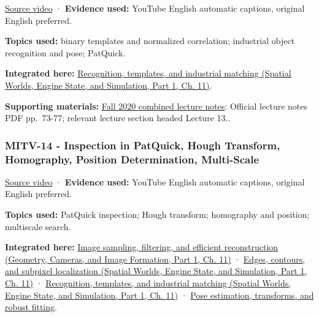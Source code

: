 \hypertarget{04-visual-computing-ii-ch036-mitv-13---object-detection-recognition-and-pose-determination-patquick-us-7016539}{}

\href{https://www.youtube.com/watch?v=lVfm6C51t_Y}{Source video} · \textbf{Evidence used:} YouTube English automatic captions, original English preferred.

\textbf{Topics used:} binary templates and normalized correlation; industrial object recognition and pose; PatQuick.

\textbf{Integrated here:} \href{../05-Spatial-Worlds-Engine-State-and-Simulation-P01/main.pdf\#04-visual-computing-ii-ch030-recognition-templates-and-industrial-matching}{Recognition, templates, and industrial matching (Spatial Worlds, Engine State, and Simulation, Part 1, Ch. 11)}.

\textbf{Supporting materials:} \href{https://ocw.mit.edu/courses/6-801-machine-vision-fall-2020/9ec44f69e72995c370b3797818ba01e6_MIT6_801F20_lectureNotes.pdf}{Fall 2020 combined lecture notes}: Official lecture notes PDF pp.~73-77; relevant lecture section headed Lecture 13..

\subsubsection{MITV-14 - Inspection in PatQuick, Hough Transform, Homography, Position Determination, Multi-Scale}\label{04-visual-computing-ii-ch036-mitv-14---inspection-in-patquick-hough-transform-homography-position-determination-multi-scale}

\hypertarget{04-visual-computing-ii-ch036-mitv-14---inspection-in-patquick-hough-transform-homography-position-determination-multi-scale}{}

\href{https://www.youtube.com/watch?v=6SvDRpQeZrA}{Source video} · \textbf{Evidence used:} YouTube English automatic captions, original English preferred.

\textbf{Topics used:} PatQuick inspection; Hough transform; homography and position; multiscale search.

\textbf{Integrated here:} \href{../03-Geometry-Cameras-and-Image-Formation-P01/main.pdf\#03-visual-computing-i-ch004-image-sampling-filtering-and-efficient-reconstruction}{Image sampling, filtering, and efficient reconstruction (Geometry, Cameras, and Image Formation, Part 1, Ch. 11)} · \href{../05-Spatial-Worlds-Engine-State-and-Simulation-P01/main.pdf\#04-visual-computing-ii-ch030-edges-contours-and-subpixel-localization}{Edges, contours, and subpixel localization (Spatial Worlds, Engine State, and Simulation, Part 1, Ch. 11)} · \href{../05-Spatial-Worlds-Engine-State-and-Simulation-P01/main.pdf\#04-visual-computing-ii-ch030-recognition-templates-and-industrial-matching}{Recognition, templates, and industrial matching (Spatial Worlds, Engine State, and Simulation, Part 1, Ch. 11)} · \hyperref[04-visual-computing-ii-ch032-pose-estimation-transforms-and-robust-fitting]{Pose estimation, transforms, and robust fitting}.

